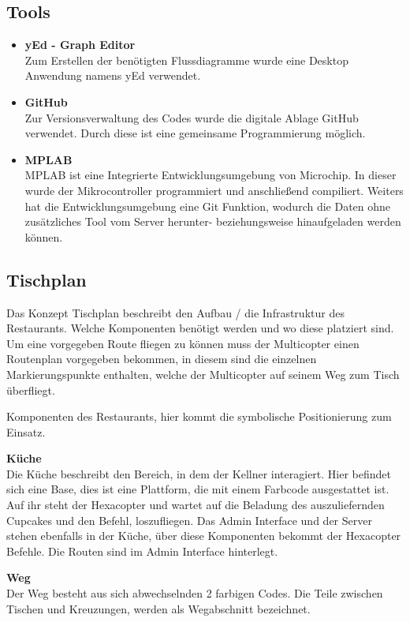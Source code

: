   \subsection{Tools}

    \begin{itemize}
      \item \textbf{yEd - Graph Editor}\\ 
      Zum Erstellen der benötigten Flussdiagramme wurde eine Desktop Anwendung namens yEd verwendet. \cite{Tool_yed}
      \item \textbf{GitHub}\\ 
      Zur Versionsverwaltung des Codes wurde die digitale Ablage GitHub verwendet. Durch diese ist eine gemeinsame Programmierung möglich.\cite{Tool_github}
      \item \textbf{MPLAB}\\ 
      MPLAB ist eine Integrierte Entwicklungsumgebung von Microchip. In dieser wurde der Mikrocontroller programmiert und anschließend compiliert. Weiters hat die Entwicklungsumgebung eine Git Funktion, wodurch die Daten ohne zusätzliches Tool vom Server herunter- beziehungsweise hinaufgeladen werden können. \cite{Tool_mplab}
    \end{itemize}

  \subsection{Tischplan}
  Das Konzept Tischplan beschreibt den Aufbau / die Infrastruktur des Restaurants. Welche Komponenten benötigt werden und wo diese platziert sind.
  Um eine vorgegeben Route fliegen zu können muss der Multicopter einen Routenplan vorgegeben bekommen, in diesem sind die einzelnen Markierungspunkte enthalten, welche der Multicopter auf seinem Weg zum Tisch überfliegt.

  Komponenten des Restaurants, hier kommt die symbolische Positionierung zum Einsatz.

  \textbf{Küche}\\
  Die Küche beschreibt den Bereich, in dem der Kellner interagiert. Hier befindet sich eine Base, dies ist eine Plattform, die mit einem Farbcode ausgestattet ist. Auf ihr steht der Hexacopter und wartet auf die Beladung des auszuliefernden Cupcakes und den Befehl, loszufliegen.
  Das Admin Interface und der Server stehen ebenfalls in der Küche, über diese Komponenten bekommt der Hexacopter Befehle. Die Routen sind im Admin Interface hinterlegt.

  \textbf{Weg}\\
  Der Weg besteht aus sich abwechselnden 2 farbigen Codes. Die Teile zwischen Tischen und Kreuzungen, werden als Wegabschnitt bezeichnet. 

